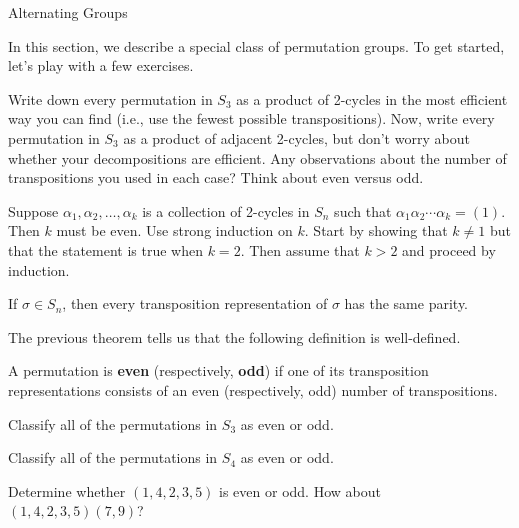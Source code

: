 \begin{section}{Alternating Groups}

In this section, we describe a special class of permutation groups.  To get started, let's play with a few exercises.

\begin{problem}
Write down every permutation in $S_3$ as a product of 2-cycles in the most efficient way you can find (i.e., use the fewest possible transpositions).  Now, write every permutation in $S_3$ as a product of adjacent 2-cycles, but don't worry about whether your decompositions are efficient.  Any observations about the number of transpositions you used in each case?  Think about even versus odd.
\end{problem}

\begin{lemma}
Suppose $\alpha_1,\alpha_2,\ldots,\alpha_k$ is a collection of 2-cycles in $S_n$ such that $\alpha_1\alpha_2\cdots\alpha_k=(1)$.  Then $k$ must be even.  Use strong induction on $k$. Start by showing that $k\neq 1$ but that the statement is true when $k=2$. Then assume that $k>2$ and proceed by induction.
\end{lemma}

\begin{theorem}
If $\sigma\in S_n$, then every transposition representation of $\sigma$ has the same parity.
\end{theorem}

The previous theorem tells us that the following definition is well-defined.

\begin{definition}
A permutation is \textbf{even} (respectively, \textbf{odd}) if one of its transposition representations consists of an even (respectively, odd) number of transpositions.
\end{definition}

\begin{problem}
Classify all of the permutations in $S_3$ as even or odd.
\end{problem}

\begin{problem}
Classify all of the permutations in $S_4$ as even or odd.
\end{problem}

\begin{problem}
Determine whether $(1,4,2,3,5)$ is even or odd.  How about $(1,4,2,3,5)(7,9)$?
\end{problem}


\end{section}
